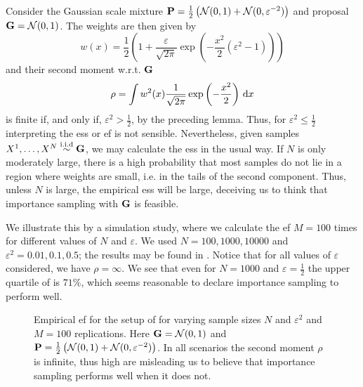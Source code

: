 \begin{example}
    \label{ex:ess_failure}
    Consider the Gaussian scale mixture $\P = \frac{1}{2} \left(\mathcal N (0,1) + \mathcal N(0, \varepsilon^{-2})\right)$ and proposal $\G = \mathcal N(0, 1)$. The weights are then given by 
    $$
        w(x) = \frac{1}{2} \left( 1 + \frac{\varepsilon}{\sqrt{2\pi}} \exp \left( - \frac{x^{2}}{2} \left( \varepsilon^{2} - 1\right) \right)\right)
    $$ and their second moment w.r.t. $\G$ 
    $$
    \rho = \int w^{2}(x) \frac{1}{\sqrt{2\pi}} \exp \left( -\frac{x^{2}}{2} \right) \d x
    $$
    is finite if, and only if, $\varepsilon^{2} > \frac{1}{2}$, by the preceding lemma. Thus, for $\varepsilon^{2} \leq \frac{1}{2}$ interpreting the \acrshort{ess} or \acrshort{ef} is not sensible. Nevertheless, given samples $X^{1}, \dots, X^{N} \iid \G$, we may calculate the \acrshort{ess} in the usual way. If $N$ is only moderately large, there is a high probability that most samples do not lie in a region where weights are small, i.e. in the tails of the second component. Thus, unless $N$ is large, the empirical \acrshort{ess} will be large, deceiving us to think that importance sampling with $\G$ is feasible.

    We illustrate this by a simulation study, where we calculate the \acrshort{ef} $M=100$ times for different values of $N$ and $\varepsilon$. We used $N = 100, 1000, 10000$ and $\varepsilon^{2} = 0.01, 0.1, 0.5$; the results may be found in . Notice that for all values of $\varepsilon$ considered, we have $\rho = \infty$. We see that even for $N = 1000$ and $\varepsilon = \frac{1}{2}$ the upper quartile of  is $71\%$, which seems reasonable to declare importance sampling to perform well. 

    \begin{figure}
        \centering

        \resizebox{\textwidth}{!}{%
        }
        \caption{Empirical \acrshort{ef} for the setup of  for varying sample sizes $N$ and $\varepsilon^{2}$ and $M=100$ replications. Here $\G = \mathcal N(0,1)$ and $\P = \frac{1}{2} \left( \mathcal N (0,1) + \mathcal N(0, \varepsilon^{-2}) \right)$. In all scenarios the second moment $\rho$ is infinite, thus high  are misleading us to believe that importance sampling performs well when it does not.}
        \label{fig:ess_failure}
    \end{figure}

\end{example}


